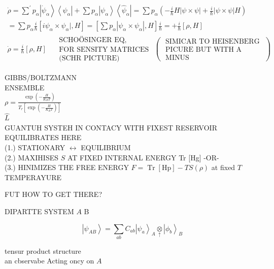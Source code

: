\documentclass[10pt]{article}
\begin{document}
$$
\begin{array}{r}
\dot{\rho}=\sum^{\prime} p_{\alpha}\left|\dot{\psi}_{\alpha}\right\rangle\left\langle\psi_{\alpha}\right|+\sum p_{\alpha}\left|\psi_{\alpha}\right\rangle\left\langle\hat{\psi}_{\alpha}\right|=\sum p_{\alpha}\left(-\frac{i}{\hbar} H|\psi \times \psi|+\frac{i}{\hbar}|\psi \times \psi| H\right) \\
=\sum p_{\alpha} \frac{i}{\hbar}\left[i \psi_{\alpha} \times \psi_{\alpha} \mid, H\right]=\left[\sum p_{\alpha}\left|\psi_{\alpha} \times \psi_{\alpha}\right|, H\right] \frac{i}{\hbar}=+\frac{i}{\hbar}[\rho, H] \\
\dot{\rho}=\frac{i}{\hbar}[\rho, H] \quad \begin{array}{l}
\text { SCHOÖSINGER EQ, } \\
\text { FOR SENSITY MATRICES } \\
\text { (SCHR PICTURE) }
\end{array}\left(\begin{array}{c}
\text { SIMICAR TO HEISENBERG } \\
\text { PICURE BUT WITH A } \\
\text { MINUS }
\end{array}\right)
\end{array}
$$

GIBBS/BOLTZMANN\\
ENSEMBLE\\
$\rho=\frac{\exp \left(-\frac{H}{K_{B} T}\right)}{T_{r}\left[\exp \left(-\frac{H}{K_{B} T}\right)\right]}$\\
$\hat{L}$\\
GUANTUH SYSTEH IN CONTACY WITH FIXEST RESERVOIR EQUILIBRATES HERE\\
(1.) STATIONARY $\leftrightarrow$ EQUILIBRIUM\\
(2.) MAXIHISES $S$ AT FIXED INTERNAL ENERGY Tr [Hg] -OR-\\
(3.) HINIMIZES THE FREE ENERGY $F=\operatorname{Tr}[\mathrm{Hp}]-T S(\rho)$ at fixed $T$ TEMPERAYURE

FUT HOW TO GET THERE?

DIPARTTE SYSTEM $A$ B

$$
\left|\psi_{A B}\right\rangle=\sum_{a b} C_{a b}\left|\psi_{a}\right\rangle_{A} \underset{\uparrow}{\otimes}\left|\phi_{b}\right\rangle_{B}
$$

tensur product structure\\
an cbservabe Acting oncy on $A$
\end{document}
